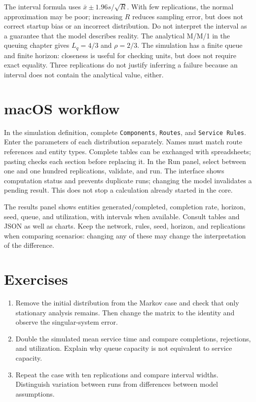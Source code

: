 The interval formula uses \(\bar x\pm1.96s/\sqrt R\). With few
replications, the normal approximation may be poor; increasing \(R\) reduces
sampling error, but does not correct startup bias or an incorrect distribution.
Do not interpret the interval as a guarantee that the model describes reality.
The analytical M/M/1 in the queuing chapter gives \(L_q=4/3\) and
\(\rho=2/3\). The simulation has a finite queue and finite horizon:
closeness is useful for checking units, but does not require exact equality.
Three replications do not justify inferring a failure because an interval does
not contain the analytical value, either.

\section{macOS workflow}
In the simulation definition, complete \texttt{Components}, \texttt{Routes}, and \texttt{Service Rules}. Enter the parameters of each
distribution separately. Names must match route references and entity types.
Complete tables can be exchanged with spreadsheets; pasting checks each
section before replacing it. In the Run panel, select between one and one
hundred replications, validate, and run. The interface shows computation status
and prevents duplicate runs; changing the model invalidates a pending result.
This does not stop a calculation already started in the core.

The results panel shows entities generated/completed, completion rate, horizon,
seed, queue, and utilization, with intervals when available. Consult tables
and JSON as well as charts. Keep the network, rules, seed, horizon, and
replications when comparing scenarios: changing any of these may change the
interpretation of the difference.

\section{Exercises}
\begin{enumerate}
\item Remove the initial distribution from the Markov case and check that
only stationary analysis remains. Then change the matrix to the identity and
observe the singular-system error.
\item Double the simulated mean service time and compare completions,
rejections, and utilization. Explain why queue capacity is not equivalent to
service capacity.
\item Repeat the case with ten replications and compare interval widths.
Distinguish variation between runs from differences between model assumptions.
\end{enumerate}
